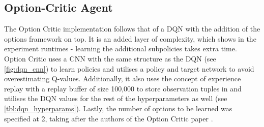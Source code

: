\documentclass[notitlepage,a4paper,11pt]{article}
\begin{document}
\subsection{Option-Critic Agent}
The Option Critic implementation follows that of a DQN with the addition of the options framework on top. It is an added layer of complexity, which shows in the experiment runtimes - learning the additional subpolicies takes extra time. Option Critic uses a CNN with the same structure as the DQN (see \ref{fig:dqn_cnn}) to learn policies and utilises a policy and target network to avoid overestimating Q-values. Additionally, it also uses the concept of experience replay with a replay buffer of size 100,000 to store observation tuples in and utilises the DQN values for the rest of the hyperparameters as well (see \ref{tbl:dqn_hyperparams}). Lastly, the number of options to be learned was specified at 2, taking after the authors of the Option Critic paper \cite{bacon2017option}. 
\end{document}
